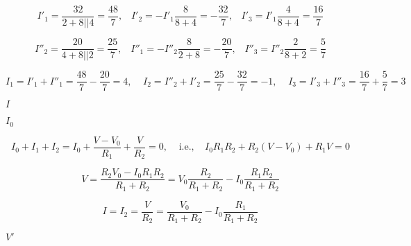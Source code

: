 {\newpage\clearpage
{}%
\begin{displaymath} I'_1=\frac{32}{2+8 || 4}=\frac{48}{7},\;\;\;I'_2=-I'_1\frac{8}{8+4}=-\frac{32}{7},
   \;\;\;I'_3=I'_1\frac{4}{8+4}=\frac{16}{7} \end{displaymath}%
\lthtmldisplayZ
\lthtmlcheckvsize\clearpage}

{\newpage\clearpage
{}%
\begin{displaymath} I''_2=\frac{20}{4+8 || 2}=\frac{25}{7},\;\;\;I''_1=-I''_2\frac{8}{2+8}=-\frac{20}{7},
   \;\;\;I''_3=I''_2\frac{2}{8+2}=\frac{5}{7} \end{displaymath}%
\lthtmldisplayZ
\lthtmlcheckvsize\clearpage}

{\newpage\clearpage
{}%
\begin{displaymath} I_1=I'_1+I''_1=\frac{48}{7}-\frac{20}{7}=4,\;\;\;\;
   I_2=I''_2+I'_2=\frac{25}{7}-\frac{32}{7}=-1,\;\;\;\;
   I_3=I'_3+I''_3=\frac{16}{7}+\frac{5}{7}=3 \end{displaymath}%
\lthtmldisplayZ
\lthtmlcheckvsize\clearpage}

{\newpage\clearpage
{}%
$I$%
\lthtmlinlinemathZ
\lthtmlcheckvsize\clearpage}

{\newpage\clearpage
{}%
$I_0$%
\lthtmlinlinemathZ
\lthtmlcheckvsize\clearpage}

{\newpage\clearpage
{}%
\begin{displaymath} I_0+I_1+I_2=I_0+\frac{V-V_0}{R_1}+\frac{V}{R_2}=0,\;\;\;\;\mbox{i.e.,}\;\;\;\;
I_0R_1R_2+R_2(V-V_0)+R_1V=0 \end{displaymath}%
\lthtmldisplayZ
\lthtmlcheckvsize\clearpage}

{\newpage\clearpage
{}%
\begin{displaymath} V=\frac{R_2V_0-I_0R_1R_2}{R_1+R_2}
  =V_0\frac{R_2}{R_1+R_2}-I_0\frac{R_1R_2}{R_1+R_2} \end{displaymath}%
\lthtmldisplayZ
\lthtmlcheckvsize\clearpage}

{\newpage\clearpage
{}%
\begin{displaymath} I=I_2=\frac{V}{R_2}=\frac{V_0}{R_1+R_2}-I_0\frac{R_1}{R_1+R_2} \end{displaymath}%
\lthtmldisplayZ
\lthtmlcheckvsize\clearpage}

{\newpage\clearpage
{}%
$V'$%
\lthtmlinlinemathZ
\lthtmlcheckvsize\clearpage}

